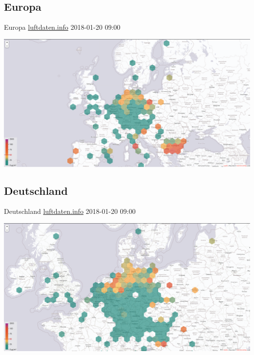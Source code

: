 \documentclass[aspectratio=169]{beamer} %
\begin{document}
\subsection{Europa}
\begin{frame}{Europa \href{http://hannover.maps.luftdaten.info/\#5/52.373/10.005}{luftdaten.info} 2018-01-20 09:00}
  \begin{center}
    \includegraphics[width=\textwidth]{../screenshots/luftdaten-zoom-e.png}
  \end{center}
\end{frame}
\subsection{Deutschland}
\begin{frame}{Deutschland \href{http://hannover.maps.luftdaten.info/\#6/52.373/10.005}{luftdaten.info} 2018-01-20 09:00}
  \begin{center}
    \includegraphics[width=\textwidth]{../screenshots/luftdaten-zoom-f.png}
  \end{center}
\end{frame}
\end{document}
